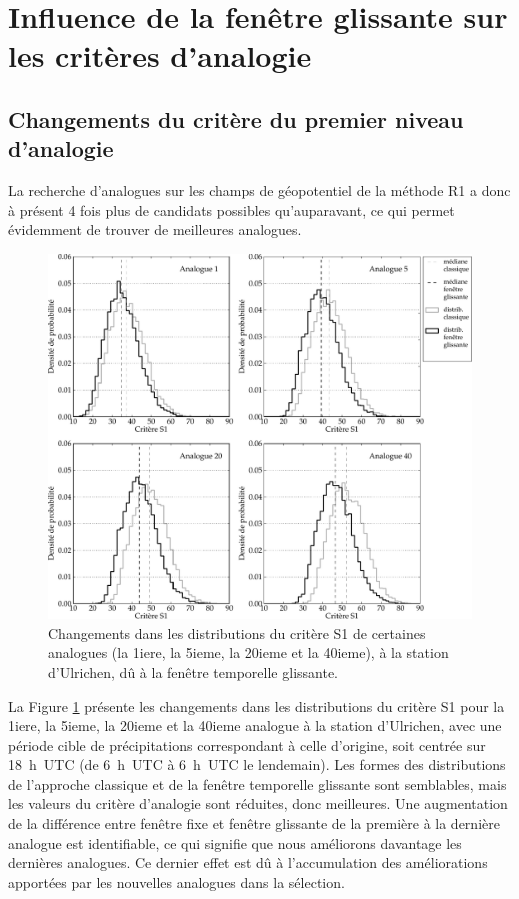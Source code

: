 \documentclass[hess]{copernicus}
\begin{document}
\section{Influence de la fenêtre glissante sur les critères d'analogie}


\subsection{Changements du critère du premier niveau d'analogie}


La recherche d'analogues sur les champs de géopotentiel de la méthode R1 a donc à présent 4 fois plus de candidats possibles qu'auparavant, ce qui permet évidemment de trouver de meilleures analogues. 

\begin{figure}[htb]
	\begin{center}
		\includegraphics[width=15cm]{figures/Graphique_fenetre_glissante_chmts_S1_analogues.pdf}
	\end{center}
	\caption{Changements dans les distributions du critère S1 de certaines analogues (la 1iere, la 5ieme, la 20ieme et la 40ieme), à la station d'Ulrichen, dû à la fenêtre temporelle glissante.}
	\label{fig:Graphique_fenetre_glissante_chmts_S1_analogues}
\end{figure}

La Figure \ref{fig:Graphique_fenetre_glissante_chmts_S1_analogues} présente les changements dans les distributions du critère S1 pour la 1iere, la 5ieme, la 20ieme et la 40ieme analogue à la station d'Ulrichen, avec une période cible de précipitations correspondant à celle d'origine, soit centrée sur 18~h~UTC (de 6~h~UTC à 6~h~UTC le lendemain). Les formes des distributions de l'approche classique et de la fenêtre temporelle glissante sont semblables, mais les valeurs du critère d'analogie sont réduites, donc meilleures. Une augmentation de la différence entre fenêtre fixe et fenêtre glissante de la première à la dernière analogue est identifiable, ce qui signifie que nous améliorons davantage les dernières analogues. Ce dernier effet est dû à l'accumulation des améliorations apportées par les nouvelles analogues dans la sélection.
\end{document}

